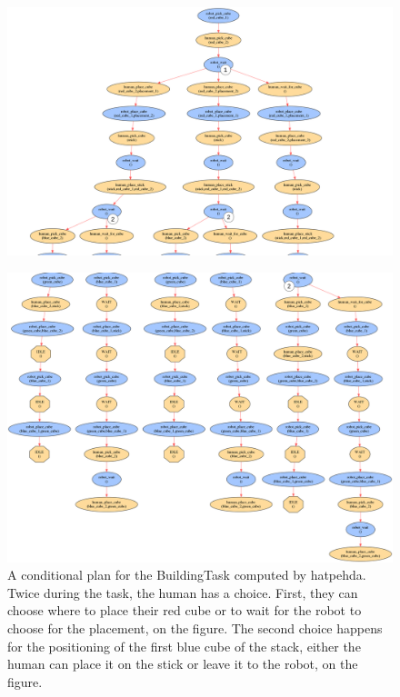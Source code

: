 \documentclass[a4paper,11pt,twoside]{StyleThese}
\begin{document}
\begin{landscape}
	\thispagestyle{example}
	\begin{figure}[!hp]
		\centering
		\includegraphics[scale=0.35]{figures/chapter2/plan_building.png}
	\end{figure}
\end{landscape}

\begin{landscape}
	\thispagestyle{example}
	\begin{figure}[!hp]
		\centering
		\includegraphics[scale=0.31]{figures/chapter2/plan_building2.png}
		\caption{A conditional plan for the BuildingTask computed by \acrshort{hatpehda}. Twice during the task, the human has a choice. First, they can choose where to place their red cube or to wait for the robot to choose for the placement,  on the figure. The second choice happens for the positioning of the first blue cube of the stack, either the human can place it on the stick or leave it to the robot,  on the figure.}
		\label{chap6:fig:plan_building2}
	\end{figure}
\end{landscape}
\restoregeometry
\end{document}
